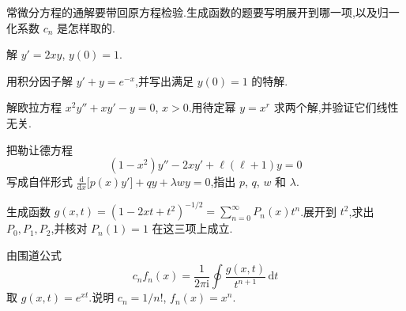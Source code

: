 常微分方程的通解要带回原方程检验.生成函数的题要写明展开到哪一项,以及归一化系数 $c_n$ 是怎样取的.

\begin{problemset}
\renewcommand{\theenumi}{\thechapter.\arabic{enumi}}
\renewcommand{\labelenumi}{\theenumi.}
\item 解 $y'=2xy$, $y(0)=1$.

\item 用积分因子解 $y'+y=e^{-x}$,并写出满足 $y(0)=1$ 的特解.

\item 解欧拉方程 $x^2 y''+xy'-y=0$, $x>0$.用待定幂 $y=x^r$ 求两个解,并验证它们线性无关.

\item 把勒让德方程
\begin{equation*}
  (1-x^2)y''-2xy'+\ell(\ell+1)y=0
\end{equation*}
写成自伴形式 $\frac{\mathrm{d}}{\mathrm{d}x}\bigl[p(x)y'\bigr]+qy+\lambda wy=0$,指出 $p$, $q$, $w$ 和 $\lambda$.

\item 生成函数 $g(x,t)=(1-2xt+t^2)^{-1/2}=\sum_{n=0}^{\infty}P_n(x)t^n$.展开到 $t^2$,求出 $P_0,P_1,P_2$,并核对 $P_n(1)=1$ 在这三项上成立.

\item 由围道公式
\begin{equation*}
  c_n f_n(x)=\frac{1}{2\pi\mathrm{i}}\oint\frac{g(x,t)}{t^{n+1}}\,\mathrm{d}t
\end{equation*}
取 $g(x,t)=e^{xt}$.说明 $c_n=1/n!$, $f_n(x)=x^n$.
\end{problemset}
